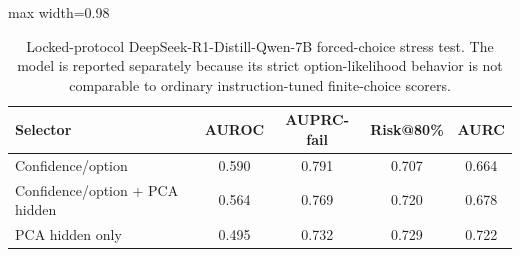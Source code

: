 
\begin{table}[t]
\centering
\small
\caption{Locked-protocol DeepSeek-R1-Distill-Qwen-7B forced-choice stress test. The model is reported separately because its strict option-likelihood behavior is not comparable to ordinary instruction-tuned finite-choice scorers.}
\label{tab:locked-deepseek-stress}
\begin{adjustbox}{max width=0.98\linewidth}
\begin{tabular}{lcccc}
\toprule
Selector & AUROC & AUPRC-fail & Risk@80\% & AURC \\
\midrule
Confidence/option & 0.590 & 0.791 & 0.707 & 0.664 \\
Confidence/option + PCA hidden & 0.564 & 0.769 & 0.720 & 0.678 \\
PCA hidden only & 0.495 & 0.732 & 0.729 & 0.722 \\
\bottomrule
\end{tabular}
\end{adjustbox}
\end{table}
